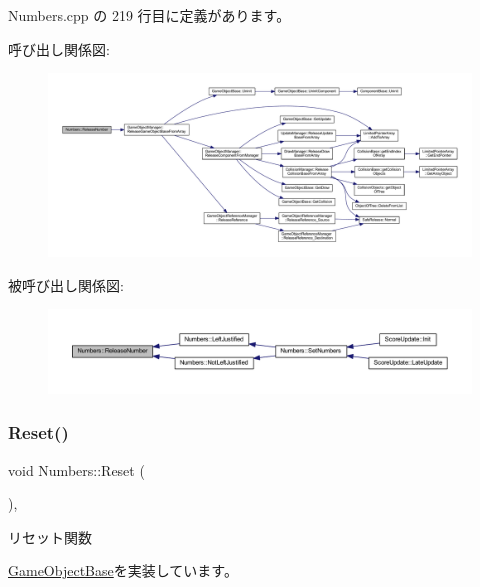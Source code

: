  Numbers.\+cpp の 219 行目に定義があります。

呼び出し関係図\+:\nopagebreak
\begin{figure}[H]
\begin{center}
\leavevmode
\includegraphics[width=350pt]{class_numbers_a1eb0843ca2449c52e21c84b96bfa4dc5_cgraph}
\end{center}
\end{figure}
被呼び出し関係図\+:\nopagebreak
\begin{figure}[H]
\begin{center}
\leavevmode
\includegraphics[width=350pt]{class_numbers_a1eb0843ca2449c52e21c84b96bfa4dc5_icgraph}
\end{center}
\end{figure}
\mbox{\label{class_numbers_a1ab67e439ba1695c8fd545dfc1650990}} 
\subsubsection{\texorpdfstring{Reset()}{Reset()}}
{\footnotesize\ttfamily void Numbers\+::\+Reset (\begin{DoxyParamCaption}{ }\end{DoxyParamCaption})\hspace{0.3cm}{\ttfamily [override]}, {\ttfamily [virtual]}}



リセット関数 



\mbox{\hyperlink{class_game_object_base_a85c59554f734bcb09f1a1e18d9517dce}{Game\+Object\+Base}}を実装しています。



